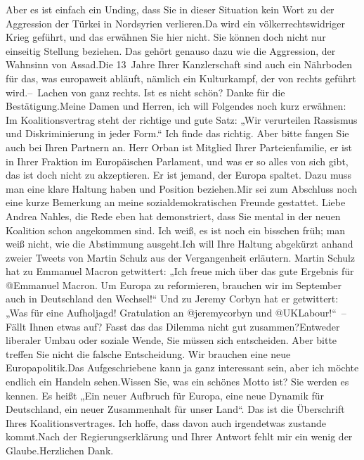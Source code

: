 \documentclass{article}
\begin{document}
Aber es ist einfach ein Unding, dass Sie in dieser Situation kein Wort zu der Aggression der Türkei in Nordsyrien verlieren.Da wird ein völkerrechtswidriger Krieg geführt, und das erwähnen Sie hier nicht. Sie können doch nicht nur einseitig Stellung beziehen. Das gehört genauso dazu wie die Aggression, der Wahnsinn von Assad.Die 13 Jahre Ihrer Kanzlerschaft sind auch ein Nährboden für das, was europaweit abläuft, nämlich ein Kulturkampf, der von rechts geführt wird.– Lachen von ganz rechts. Ist es nicht schön? Danke für die Bestätigung.Meine Damen und Herren, ich will Folgendes noch kurz erwähnen: Im Koalitionsvertrag steht der richtige und gute Satz: „Wir verurteilen Rassismus und Diskriminierung in jeder Form.“ Ich finde das richtig. Aber bitte fangen Sie auch bei Ihren Partnern an. Herr Orban ist Mitglied Ihrer Parteienfamilie, er ist in Ihrer Fraktion im Europäischen Parlament, und was er so alles von sich gibt, das ist doch nicht zu akzeptieren. Er ist jemand, der Europa spaltet. Dazu muss man eine klare Haltung haben und Position beziehen.Mir sei zum Abschluss noch eine kurze Bemerkung an meine sozialdemokratischen Freunde gestattet. Liebe Andrea Nahles, die Rede eben hat demonstriert, dass Sie mental in der neuen Koalition schon angekommen sind. Ich weiß, es ist noch ein bisschen früh; man weiß nicht, wie die Abstimmung ausgeht.Ich will Ihre Haltung abgekürzt anhand zweier Tweets von Martin Schulz aus der Vergangenheit erläutern. Martin Schulz hat zu Emmanuel Macron getwittert: „Ich freue mich über das gute Ergebnis für @Emmanuel Macron. Um Europa zu reformieren, brauchen wir im September auch in Deutschland den Wechsel!“ Und zu Jeremy Corbyn hat er getwittert: „Was für eine Aufholjagd! Gratulation an @jeremycorbyn und @UKLabour!“ – Fällt Ihnen etwas auf? Fasst das das Dilemma nicht gut zusammen?Entweder liberaler Umbau oder soziale Wende, Sie müssen sich entscheiden. Aber bitte treffen Sie nicht die falsche Entscheidung. Wir brauchen eine neue Europapolitik.Das Aufgeschriebene kann ja ganz interessant sein, aber ich möchte endlich ein Handeln sehen.Wissen Sie, was ein schönes Motto ist? Sie werden es kennen. Es heißt „Ein neuer Aufbruch für Europa, eine neue Dynamik für Deutschland, ein neuer Zusammenhalt für unser Land“. Das ist die Überschrift Ihres Koalitionsvertrages. Ich hoffe, dass davon auch irgendetwas zustande kommt.Nach der Regierungserklärung und Ihrer Antwort fehlt mir ein wenig der Glaube.Herzlichen Dank.
\end{document}
